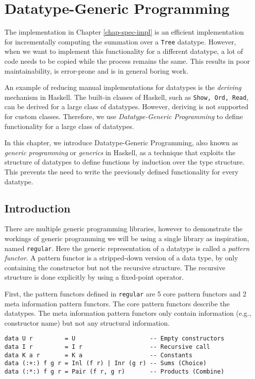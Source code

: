 \chapter{Datatype-Generic Programming}

The implementation in Chapter \ref{chap-spec-impl} is an efficient implementation for incrementally computing the summation over a \texttt{Tree} datatype. However, when we want to implement this functionality for a different datatype, a lot of code needs to be copied while the process remains the same. This results in poor maintainability, is error-prone and is in general boring work.

An example of reducing manual implementations for datatypes is the \textit{deriving} mechanism in Haskell. The built-in classes of Haskell, such as \texttt{Show, Ord, Read}, can be derived for a large class of datatypes. However, deriving is not supported for custom classes. Therefore, we use \textit{Datatype-Generic Programming}\cite*{gibbons2006datatype} to define functionality for a large class of datatypes.

In this chapter, we introduce Datatype-Generic Programming, also known as \textit{generic programming} or \textit{generics} in Haskell, as a technique that exploits the structure of datatypes to define functions by induction over the type structure. This prevents the need to write the previously defined functionality for every datatype.

\section{Introduction}
There are multiple generic programming libraries, however to demonstrate the workings of generic programming we will be using a single library as inspiration, named \texttt{regular}\cite*{regular2022}. Here the generic representation of a datatype is called a \textit{pattern functor}. A pattern functor is a stripped-down version of a data type, by only containing the constructor but not the recursive structure. The recursive structure is done explicitly by using a fixed-point operator. 

First, the pattern functors defined in \texttt{regular} are 5 core pattern functors and 2 meta information pattern functors. The core pattern functors describe the datatypes. The meta information pattern functors only contain information (e.g., constructor name) but not any structural information.

\begin{verbatim}
data U r         = U                     -- Empty constructors
data I r         = I r                   -- Recursive call
data K a r       = K a                   -- Constants
data (:+:) f g r = Inl (f r) | Inr (g r) -- Sums (Choice)
data (:*:) f g r = Pair (f r, g r)       -- Products (Combine)
\end{verbatim}

